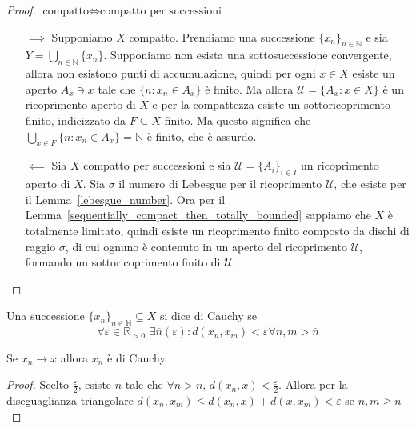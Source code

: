\begin{proof}\( \text{compatto} \iff \text{compatto per successioni}\) 
\begin{itemize}
    \item[\(\implies \)] Supponiamo \(X\) compatto. Prendiamo una successione
        \(\{x_{n}\}_{n \in \mathbb{N}}\) e sia \(Y = \bigcup_{n \in \mathbb{N}}
        \{x_{n}\} \).  Supponiamo non esista una
        sottosuccessione convergente, allora non esistono punti di
        accumulazione, quindi per ogni \(x \in X\) esiste un aperto \(A_x \ni
        x\) tale che \(\{n: x_n \in A_x\} \) è finito. Ma allora \(\mathcal{U} = \{A_x
        : x \in X\} \) è un ricoprimento aperto di \(X\) e per la compattezza
        esiste un sottoricoprimento finito, indicizzato da \(F \subseteq X \)
        finito. Ma questo significa che \(\bigcup_{x \in F} \{n: x_n \in A_x\}
        = \mathbb{N}\) è finito, che è assurdo.
    \item[\(\impliedby \)] 
    Sia \(X\) compatto per successioni e sia \(\mathcal{U} = \{A_{i}\}_{i \in
    I}\) un ricoprimento aperto di \(X\). Sia \(\sigma\) il numero di Lebesgue
    per il ricoprimento \(\mathcal{U}\), che esiste per il
    Lemma~\ref{lebesgue_number}. Ora per il
    Lemma~\ref{sequentially_compact_then_totally_bounded} sappiamo che \(X\) è
    totalmente limitato, quindi esiste un ricoprimento finito composto da dischi
    di raggio \(\sigma\), di cui ognuno è contenuto in un aperto del
    ricoprimento \(\mathcal{U}\), formando un sottoricoprimento finito di
    \(\mathcal{U}\).
\end{itemize}
\end{proof}
\begin{definition}
    Una successione \(\{x_{n}\}_{n \in \mathbb{N}} \subseteq X \) si dice di
    Cauchy se 
    \[
        \forall \varepsilon \in \mathbb{R}_{> 0}\,\,\exists
        \overline{n}(\varepsilon) : d(x_{n}, x_{m}) < \varepsilon \forall n, m >
        \overline{n}
    \]
\end{definition}
\begin{proposition}
    Se \(x_{n} \to x\) allora \(x_{n}\) è di Cauchy.
\end{proposition}
\begin{proof}
    Scelto \(\frac{\varepsilon}{2}\), esiste \(\overline{n}\) tale che \(\forall
    n > \overline{n}\), \(d(x_{n}, x) < \frac{\varepsilon}{2}\). Allora per la
    diseguaglianza triangolare \(d(x_{n}, x_{m}) \le d(x_{n}, x) + d(x, x_{m}) <
    \varepsilon\) se \(n, m \ge \overline{n}\) 
\end{proof}
